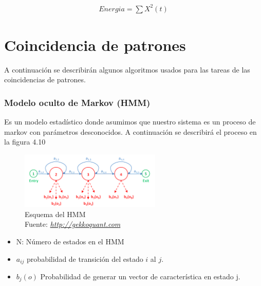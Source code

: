 	\begin{equation}
		\label{energia}
		\begin{aligned}
			Energia=\sum X^{2}(t)
		\end{aligned}
	\end{equation}	




\section{Coincidencia de patrones}
A continuación se describirán algunos algoritmos usados para las tareas de las coincidencias de patrones.

\subsubsection{Modelo oculto de Markov (HMM)}
Es un modelo estadístico donde asumimos que nuestro sistema es un proceso de markov con parámetros desconocidos. A continuación se describirá el proceso en la figura 4.10

\begin{figure}[H]
	\centering
	\includegraphics[width=0.6\textwidth]{Figures/hmm}
	\caption{Esquema del HMM\\ Fuente:  \href{http://gekkoquant.com/2014/05/18/hidden-markov-models-model-description-part-1-of-4/}{\textit{http://gekkoquant.com}}}
	\label{}
\end{figure} 
\begin{itemize}
	\item N: Número de estados en el HMM
	\item $a_{ij}$ probabilidad de transición del estado $i$ al $j$.
	\item $	b_{j}(o)$ Probabilidad de generar un vector de característica en estado j.
	
\end{itemize}
